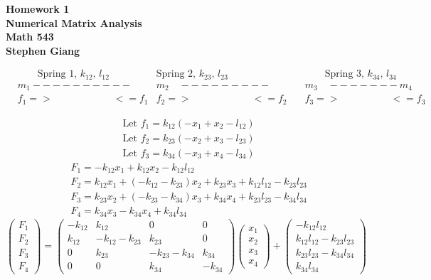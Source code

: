 \documentclass[12pt]{article}
\begin{document}
	
	\begin{center}
		\textbf{Homework 1} \\
		\textbf{Numerical Matrix Analysis} \\
		\textbf{Math 543} \\
		\textbf{Stephen Giang} \\
	\end{center}

	\begin{align}
		&\qquad \text{Spring 1, } k_{12} \text{, } l_{12} &\text{Spring 2, } k_{23} \text{, } l_{23} \qquad   &\qquad \text{Spring 3, } k_{34} \text{, } l_{34} &\\ 
		&m_1 ----------&m_2 \quad --------- \quad &m_3 \quad -------m_4& \\
		&f_1=>\qquad\qquad\qquad<=f_1&f_2=>\qquad\qquad\qquad<=f_2\quad &f_3=>\qquad\qquad\quad<=f_3&
	\end{align}

	\begin{align}
		&\text{Let } f_1 = k_{12}(-x_1 + x_2 - l_{12}) \\
		&\text{Let } f_2 = k_{23}(-x_2 + x_3 - l_{23}) \\
		&\text{Let } f_3 = k_{34}(-x_3 + x_4 - l_{34})
	\end{align}
	\begin{align}
		&F_1 = -k_{12}x_1 + k_{12}x_2 - k_{12}l_{12} \\
		&F_2 = k_{12}x_1 +( -k_{12} - k_{23}) x_2 + k_{23}x_3 + k_{12}l_{12} - k_{23}l_{23} \\
		&F_3 = k_{23}x_2 +( -k_{23} - k_{34}) x_3 + k_{34}x_4 + k_{23}l_{23} - k_{34}l_{34} \\
		&F_4 = k_{34}x_3 - k_{34}x_4 + k_{34}l_{34} 
	\end{align}
\vspace{\baselineskip}
	$$ 
	\begin{pmatrix}
		F_1 \\
		F_2 \\
		F_3 \\
		F_4
	\end{pmatrix} 
	=
	\begin{pmatrix}
		-k_{12}  & k_{12} & 0 & 0 \\
		k_{12}   & -k_{12} - k_{23} & k_{23} & 0 \\
		0   & k_{23} & -k_{23} - k_{34} & k_{34} \\
		0   &  0 &  k_{34} & -k_{34} 
	\end{pmatrix}
	\begin{pmatrix}
		x_1 \\
		x_2 \\
		x_3 \\
		x_4
	\end{pmatrix} 
	+
	\begin{pmatrix}
		-k_{12}l_{12} \\
		k_{12}l_{12} - k_{23}l_{23} \\
		k_{23}l_{23} - k_{34}l_{34} \\
		k_{34}l_{34}
	\end{pmatrix}
	$$
\vspace{\baselineskip}
\vspace{\baselineskip}
	
\end{document}
